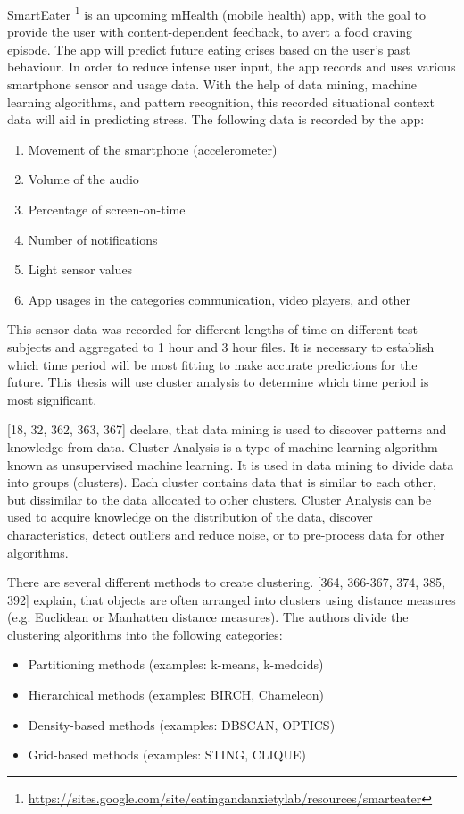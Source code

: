 SmartEater \footnote{\url{https://sites.google.com/site/eatingandanxietylab/resources/smarteater}} is an upcoming mHealth (mobile health) app, with the goal to provide the user with content-dependent feedback, to avert a food craving episode. The app will predict future eating crises based on the user's past behaviour. In order to reduce intense user input, the app records and uses various smartphone sensor and usage data. With the help of data mining, machine learning algorithms, and pattern recognition, this recorded situational context data will aid in predicting stress. The following data is recorded by the app:

\begin{enumerate}
	\item Movement of the smartphone (accelerometer)
	\item Volume of the audio
	\item Percentage of screen-on-time
	\item Number of notifications
	\item Light sensor values
	\item App usages in the categories communication, video players, and other
\end{enumerate}

This sensor data was recorded for different lengths of time on different test subjects and aggregated to 1 hour and 3 hour files. It is necessary to establish which time period will be most fitting to make accurate predictions for the future. This thesis will use cluster analysis to determine which time period is most significant.

\textcite{han2011data}[18, 32, 362, 363, 367] declare, that data mining is used to discover patterns and knowledge from data. Cluster Analysis is a type of machine learning algorithm known as unsupervised machine learning. It is used in data mining to divide data into groups (clusters). Each cluster contains data that is similar to each other, but dissimilar to the data allocated to other clusters. Cluster Analysis can be used to acquire knowledge on the distribution of the data, discover characteristics, detect outliers and reduce noise, or to pre-process data for other algorithms. 

There are several different methods to create clustering. \textcite{han2011data}[364, 366-367, 374, 385, 392] explain, that objects are often arranged into clusters using distance measures (e.g. Euclidean or Manhatten distance measures). 
The authors divide the clustering algorithms into the following categories:
\begin{itemize}
	\item Partitioning methods (examples: k-means, k-medoids)
	\item Hierarchical methods (examples: BIRCH, Chameleon)
	\item Density-based methods (examples: DBSCAN, OPTICS)
	\item Grid-based methods (examples: STING, CLIQUE)
\end{itemize}


